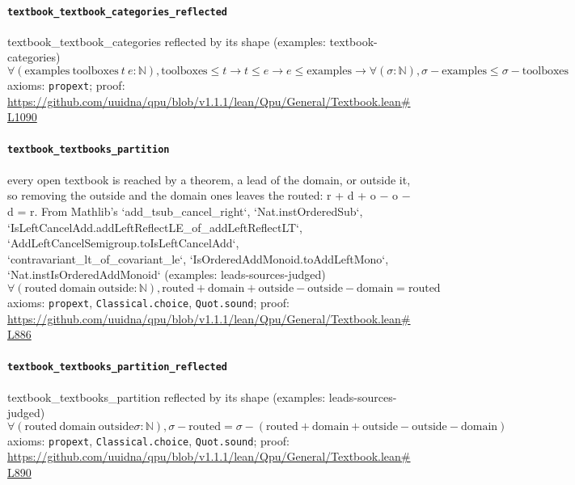 \documentclass[11pt]{article}
\begin{document}
\paragraph{\texttt{textbook\_textbook\_categories\_reflected}}
textbook\_textbook\_categories reflected by its shape (examples: textbook-categories)
\[ \forall (\mathrm{examples}\ \mathrm{toolboxes}\ t\ e : \mathbb{N}), \mathrm{toolboxes} \le t \to t \le e \to e \le \mathrm{examples} \to \forall (\sigma : \mathbb{N}), \sigma - \mathrm{examples} \le \sigma - \mathrm{toolboxes} \]
\noindent axioms: \texttt{propext}; proof: \url{https://github.com/uuidna/qpu/blob/v1.1.1/lean/Qpu/General/Textbook.lean\#L1090}

\paragraph{\texttt{textbook\_textbooks\_partition}}
every open textbook is reached by a theorem, a lead of the domain, or outside it, so removing the outside and the domain ones leaves the routed: r + d + o − o − d = r. From Mathlib's `add\_tsub\_cancel\_right`, `Nat.instOrderedSub`, `IsLeftCancelAdd.addLeftReflectLE\_of\_addLeftReflectLT`, `AddLeftCancelSemigroup.toIsLeftCancelAdd`, `contravariant\_lt\_of\_covariant\_le`, `IsOrderedAddMonoid.toAddLeftMono`, `Nat.instIsOrderedAddMonoid` (examples: leads-sources-judged)
\[ \forall (\mathrm{routed}\ \mathrm{domain}\ \mathrm{outside} : \mathbb{N}), \mathrm{routed} + \mathrm{domain} + \mathrm{outside} - \mathrm{outside} - \mathrm{domain} = \mathrm{routed} \]
\noindent axioms: \texttt{propext}, \texttt{Classical.choice}, \texttt{Quot.sound}; proof: \url{https://github.com/uuidna/qpu/blob/v1.1.1/lean/Qpu/General/Textbook.lean\#L886}

\paragraph{\texttt{textbook\_textbooks\_partition\_reflected}}
textbook\_textbooks\_partition reflected by its shape (examples: leads-sources-judged)
\[ \forall (\mathrm{routed}\ \mathrm{domain}\ \mathrm{outside} \sigma : \mathbb{N}), \sigma - \mathrm{routed} = \sigma - (\mathrm{routed} + \mathrm{domain} + \mathrm{outside} - \mathrm{outside} - \mathrm{domain}) \]
\noindent axioms: \texttt{propext}, \texttt{Classical.choice}, \texttt{Quot.sound}; proof: \url{https://github.com/uuidna/qpu/blob/v1.1.1/lean/Qpu/General/Textbook.lean\#L890}
\end{document}
